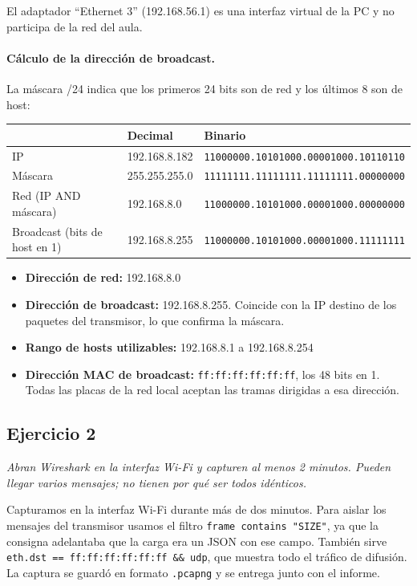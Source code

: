 \documentclass[11pt,a4paper]{article}
\begin{document}
El adaptador ``Ethernet 3'' (192.168.56.1) es una interfaz virtual de la PC y no participa de la red del aula.

\paragraph{Cálculo de la dirección de broadcast.} La máscara /24 indica que los primeros 24 bits son de red y los últimos 8 son de host:

\begin{center}
\begin{tabular}{|l|l|l|}
\hline
 & \textbf{Decimal} & \textbf{Binario} \\
\hline
IP & 192.168.8.182 & \texttt{11000000.10101000.00001000.10110110} \\
Máscara & 255.255.255.0 & \texttt{11111111.11111111.11111111.00000000} \\
Red (IP AND máscara) & 192.168.8.0 & \texttt{11000000.10101000.00001000.00000000} \\
Broadcast (bits de host en 1) & 192.168.8.255 & \texttt{11000000.10101000.00001000.11111111} \\
\hline
\end{tabular}
\end{center}

\begin{itemize}
  \item \textbf{Dirección de red:} 192.168.8.0
  \item \textbf{Dirección de broadcast:} 192.168.8.255. Coincide con la IP destino de los paquetes del transmisor, lo que confirma la máscara.
  \item \textbf{Rango de hosts utilizables:} 192.168.8.1 a 192.168.8.254
  \item \textbf{Dirección MAC de broadcast:} \texttt{ff:ff:ff:ff:ff:ff}, los 48 bits en 1. Todas las placas de la red local aceptan las tramas dirigidas a esa dirección.
\end{itemize}

\subsection*{Ejercicio 2}

\textit{Abran Wireshark en la interfaz Wi-Fi y capturen al menos 2 minutos. Pueden llegar varios mensajes; no tienen por qué ser todos idénticos.}

\medskip

Capturamos en la interfaz Wi-Fi durante más de dos minutos. Para aislar los mensajes del transmisor usamos el filtro \texttt{frame contains "SIZE"}, ya que la consigna adelantaba que la carga era un JSON con ese campo. También sirve \texttt{eth.dst == ff:ff:ff:ff:ff:ff \&\& udp}, que muestra todo el tráfico de difusión. La captura se guardó en formato \texttt{.pcapng} y se entrega junto con el informe.
\end{document}
